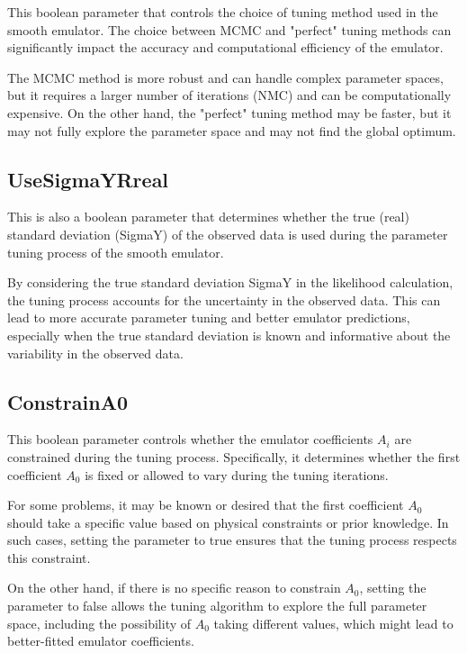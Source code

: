 \documentclass[12pt]{article}
\numberwithin{equation}{section}
\numberwithin{figure}{section}
\begin{document}
This boolean parameter that controls the choice of tuning method used in the smooth emulator. The choice between MCMC and "perfect" tuning methods can significantly impact the accuracy and computational efficiency of the emulator.

The MCMC method is more robust and can handle complex parameter spaces, but it requires a larger number of iterations (NMC) and can be computationally expensive. On the other hand, the "perfect" tuning method may be faster, but it may not fully explore the parameter space and may not find the global optimum. \\



\subsection{UseSigmaYRreal}  

This is also a boolean parameter that determines whether the true (real) standard deviation (SigmaY) of the observed data is used during the parameter tuning process of the smooth emulator.

By considering the true standard deviation SigmaY in the likelihood calculation, the tuning process accounts for the uncertainty in the observed data. This can lead to more accurate parameter tuning and better emulator predictions, especially when the true standard deviation is known and informative about the variability in the observed data.



\subsection{ConstrainA0}
 This boolean parameter controls whether the emulator coefficients $A_i$ are constrained during the tuning process. Specifically, it determines whether the first coefficient $A_0$ is fixed or allowed to vary during the tuning iterations.  

For some problems, it may be known or desired that the first coefficient $A_0$ should take a specific value based on physical constraints or prior knowledge. In such cases, setting the parameter to true ensures that the tuning process respects this constraint.

On the other hand, if there is no specific reason to constrain $A_0$, setting the parameter to false allows the tuning algorithm to explore the full parameter space, including the possibility of $A_0$ taking different values, which might lead to better-fitted emulator coefficients.\\
\end{document}
